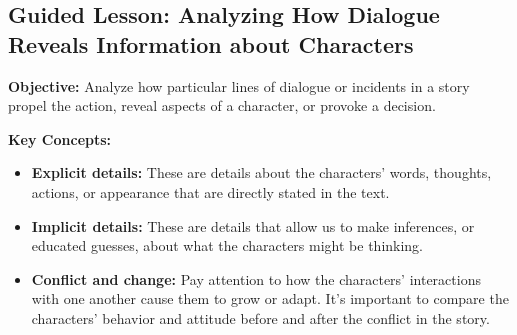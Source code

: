 \documentclass[12pt]{article}
\title{}
\date{}
\begin{document}
\subsection*{Guided Lesson: Analyzing How Dialogue Reveals Information about Characters}
\onehalfspacing

\begin{tcolorbox}[colframe=black!40, colback=gray!5, 
coltitle=black, colbacktitle=black!20, fonttitle=\bfseries\Large, 
title=Learning Objective, halign title=center, left=5pt, right=5pt, top=5pt, bottom=15pt]
\textbf{Objective:} Analyze how particular lines of dialogue or incidents in a story propel the action, reveal aspects of a character, or provoke a decision.
\end{tcolorbox}

\vspace{1em}

\begin{tcolorbox}[colframe=black!60, colback=white, 
coltitle=black, colbacktitle=black!15, fonttitle=\bfseries\Large, 
title=Key Concepts and Vocabulary, halign title=center, left=10pt, right=10pt, top=10pt, bottom=15pt]
\textbf{Key Concepts:}
\begin{itemize}
    \item \textbf{Explicit details:} These are details about the characters' words, thoughts, actions, or appearance that are directly stated in the text.
    \item \textbf{Implicit details:} These are details that allow us to make inferences, or educated guesses, about what the characters might be thinking.
    \item \textbf{Conflict and change:} Pay attention to how the characters' interactions with one another cause them to grow or adapt. It's important to compare the characters' behavior and attitude before and after the conflict in the story.
\end{itemize}
\end{tcolorbox}

\vspace{1em}
\end{document}
